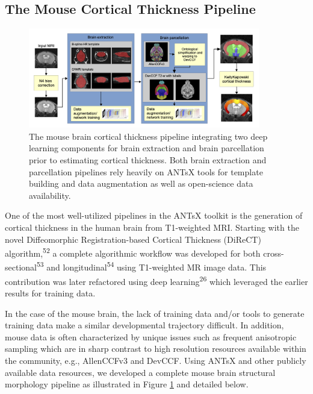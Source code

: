 \documentclass[
  12pt,
]{article}
\begin{document}
\hypertarget{the-mouse-cortical-thickness-pipeline}{%
\subsection{The Mouse Cortical Thickness
Pipeline}\label{the-mouse-cortical-thickness-pipeline}}

\begin{figure}
\centering
\includegraphics[width=0.9\textwidth]{Figures/mousePipeline.png}
\caption{The mouse brain cortical thickness pipeline integrating two 
deep learning components for brain extraction and brain parcellation 
prior to estimating cortical thickness.  Both brain extraction and
parcellation pipelines rely heavily on ANTsX tools for template building
and data augmentation as well as open-science data availability.}
\label{fig:mouseKK}
\end{figure}

One of the most well-utilized pipelines in the ANTsX toolkit is the
generation of cortical thickness in the human brain from T1-weighted
MRI. Starting with the novel Diffeomorphic Registration-based Cortical
Thickness (DiReCT) algorithm,\textsuperscript{52} a complete algorithmic
workflow was developed for both cross-sectional\textsuperscript{53} and
longitudinal\textsuperscript{54} using T1-weighted MR image data. This
contribution was later refactored using deep
learning\textsuperscript{26} which leveraged the earlier results for
training data.

In the case of the mouse brain, the lack of training data and/or tools
to generate training data make a similar developmental trajectory
difficult. In addition, mouse data is often characterized by unique
issues such as frequent anisotropic sampling which are in sharp contrast
to high resolution resources available within the community, e.g.,
AllenCCFv3 and DevCCF. Using ANTsX and other publicly available data
resources, we developed a complete mouse brain structural morphology
pipeline as illustrated in Figure \ref{fig:mouseKK} and detailed below.
\end{document}
